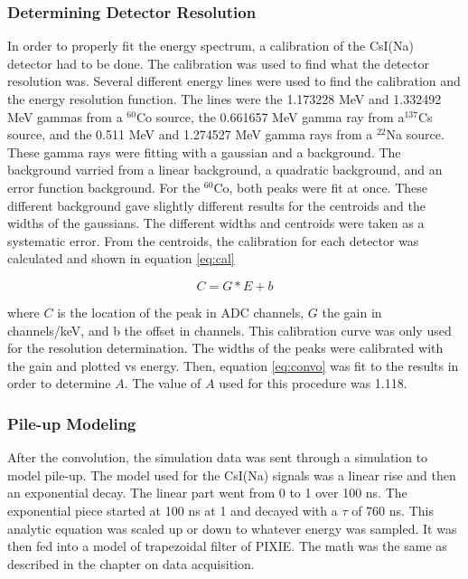 \subsubsection{Determining Detector Resolution}
In order to properly fit the energy spectrum, a calibration of the CsI(Na) detector had to be done.
The calibration was used to find what the detector resolution was.
Several different energy lines were used to find the calibration and the energy resolution function.
The lines were the 1.173228 MeV and 1.332492 MeV gammas from a $^{60}$Co source, the 0.661657 MeV gamma ray from a$^{137}$Cs source, and the 0.511 MeV and 1.274527 MeV gamma rays from a $^{22}$Na source.
These gamma rays were fitting with a gaussian and a background.
The background varried from a linear background, a quadratic background, and an error function background.
For the $^{60}$Co, both peaks were fit at once.
These different background gave slightly different results for the centroids and the widths of the gaussians.
The different widths and centroids were taken as a systematic error.
From the centroids, the calibration for each detector was calculated and shown in equation \ref{eq:cal}

\begin{equation}
	C = G * E + b
	\label{eq:cal}
\end{equation}

where $C$ is the location of the peak in ADC channels, $G$ the gain in channels/keV, and b the offset in channels.
This calibration curve was only used for the resolution determination.
The widths of the peaks were calibrated with the gain and plotted vs energy.
Then, equation \ref{eq:convo} was fit to the results in order to determine $A$.
The value of $A$ used for this procedure was 1.118.

\subsubsection{Pile-up Modeling}
After the convolution, the simulation data was sent through a simulation to model pile-up.
The model used for the CsI(Na) signals was a linear rise and then an exponential decay.
The linear part went from 0 to 1 over 100 ns. 
The exponential piece started at 100 ns at 1 and decayed with a $\tau$ of 760 ns.
This analytic equation was scaled up or down to whatever energy was sampled.
It was then fed into a model of trapezoidal filter of PIXIE. 
The math was the same as described in the chapter on data acquisition.


